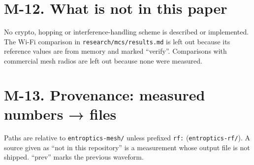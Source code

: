\documentclass[10pt,letterpaper,twocolumn]{article}
\begin{document}
\section{M-12. What is not in this paper}\label{m-12-what-is-not-in-this-paper}

No crypto, hopping or interference-handling scheme is described or implemented. The Wi-Fi comparison in \texttt{research/\allowbreak{}mcs/\allowbreak{}results.\allowbreak{}md} is left out because its reference values are from memory and marked ``verify''. Comparisons with commercial mesh radios are left out because none were measured.

\section{M-13. Provenance: measured numbers → files}\label{m-13-provenance-measured-numbers--files}

Paths are relative to \texttt{entroptics-{}\allowbreak{}mesh/\allowbreak{}} unless prefixed \texttt{rf:\allowbreak{}} (\texttt{entroptics-{}\allowbreak{}rf/\allowbreak{}}). A source given as ``not in this repository'' is a measurement whose output file is not shipped. ``prev'' marks the previous waveform.
\end{document}
